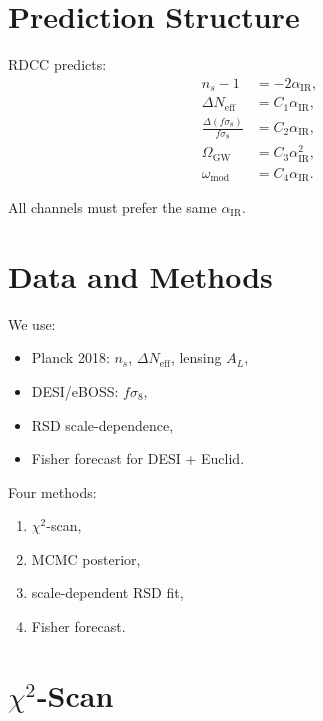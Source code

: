 \documentclass[11pt,a4paper]{article}
\begin{document}

\section{Prediction Structure}

RDCC predicts:
\begin{align}
  n_s - 1 &= -2\alpha_{\mathrm{IR}}, \\
  \Delta N_{\mathrm{eff}} &= C_1\alpha_{\mathrm{IR}}, \\
  \frac{\Delta(f\sigma_8)}{f\sigma_8} &= C_2\alpha_{\mathrm{IR}}, \\
  \Omega_{\mathrm{GW}} &= C_3\alpha_{\mathrm{IR}}^2, \\
  \omega_{\mathrm{mod}} &= C_4\alpha_{\mathrm{IR}}.
\end{align}

All channels must prefer the same $\alpha_{\mathrm{IR}}$.

\section{Data and Methods}

We use:
\begin{itemize}[leftmargin=0.8cm]
  \item Planck 2018: $n_s$, $\Delta N_{\mathrm{eff}}$, lensing $A_L$,
  \item DESI/eBOSS: $f\sigma_8$,
  \item RSD scale-dependence,
  \item Fisher forecast for DESI + Euclid.
\end{itemize}

Four methods:
\begin{enumerate}[leftmargin=0.8cm]
  \item $\chi^2$-scan,
  \item MCMC posterior,
  \item scale-dependent RSD fit,
  \item Fisher forecast.
\end{enumerate}

\section{\texorpdfstring{$\chi^2$-Scan}{chi-squared Scan}}
\end{document}
